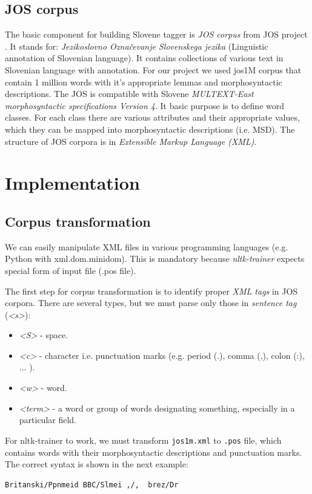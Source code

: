 \documentclass[10pt, conference, compsocconf]{IEEEtran}
\begin{document}
\subsection{JOS corpus} %
The basic component for building Slovene tagger is \textit{JOS corpus} from JOS project \cite{JOS}. It stands for: \textit{Jezikoslovno Označevanje Slovenskega jezika} (Linguistic annotation of Slovenian language).
It contains collections of various text in Slovenian language with annotation.
For our project we used jos1M corpus that contain 1 million words with it's appropriate lemmas and morphosyntactic descriptions.
The JOS is compatible with Slovene\textit{ MULTEXT-East morphosyntactic specifications Version 4}\cite{MULTEXT-East}.
It basic purpose is to define word classes.
For each class there are various attributes and their appropriate values, which they can be mapped into morphosyntactic descriptions (i.e. MSD).
The structure of JOS corpora is in  \textit{Extensible Markup Language (XML)}.

\section{Implementation}
\label{implementation}
\subsection{Corpus transformation} %
\label{Corpus transformation} 

We can easily manipulate XML files in various programming languages (e.g. Python with xml.dom.minidom).
This is mandatory because \textit{nltk-trainer}\cite{nltk-trainer} expects special form of input file (.pos file).

The first step for corpus transformation is to identify proper \textit{XML tags}\cite{xml_tags} in JOS corpora. There are several types, but we must parse only those in \textit{sentence tag }(\textit{<s>}):
\begin{itemize}
\item \textit{<S>} - space.
\item \textit{<c>} - character i.e. punctuation marks (e.g. period (.), comma (,), colon (:), ... ).
\item \textit{<w>} - word.
\item \textit{<term>} - a word or group of words designating something, especially in a particular field. 
\end{itemize}

For nltk-trainer to work, we must transform \texttt{jos1m.xml} to \texttt{.pos} file, which contains words with their morphosyntactic descriptions and punctuation marks. The correct syntax is shown in the next example:
\begin{lstlisting}
Britanski/Ppnmeid BBC/Slmei ,/,  brez/Dr 
\end{lstlisting}
\end{document}
